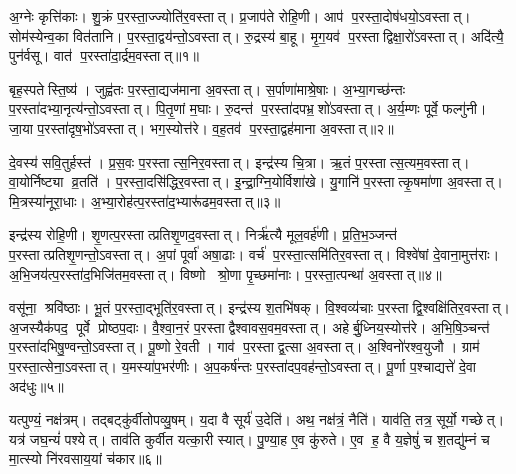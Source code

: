 \clearpage
{}
\setcounter{anuvakam}{0}

अ॒ग्नेः कृत्ति॑काः।
शु॒क्रं प॒रस्ता॒ज्ज्योति॑र॒वस्तात्।
प्र॒जाप॑ते रोहि॒णी।
आप॑ प॒रस्ता॒दोष॑धयो॒ऽवस्तात्।
सोम॑स्येन्व॒का वित॑तानि।
प॒रस्ता॒द्वय॑न्तो॒ऽवस्तात्।
रु॒द्रस्य॑ बा॒हू।
मृ॒ग॒यव॑ प॒रस्ताद्विक्षा॒रो॑ऽवस्तात्।
अदि॑त्यै॒ पुन॑र्वसू।
वात॑ प॒रस्ता॑दा॒र्द्रम॒वस्तात्॥१॥

बृह॒स्पतेस्ति॒ष्य॑।
जुह्व॑तः प॒रस्ता॒द्यज॑माना अ॒वस्तात्।
स॒र्पाणा॑माश्रे॒षाः।
अ॒भ्या॒गच्छ॑न्तः प॒रस्ता॑दभ्या॒नृत्य॑न्तो॒\-ऽवस्तात्।
पि॒तृ॒णां म॒घाः।
रु॒दन्त॑ प॒रस्ता॑दपभ्र॒शो॑ऽवस्तात्।
अ॒र्य॒म्णः पूर्वे॒ फल्गु॑नी।
जा॒या प॒रस्ता॑दृष॒भो॑ऽवस्तात्।
भग॒स्योत्त॑रे।
व॒ह॒तव॑ प॒रस्ता॒द्वह॑माना अ॒वस्तात्॥२॥

दे॒वस्य॑ सवि॒तुर्\mbox{}हस्त॑।
प्र॒स॒वः प॒रस्तात्स॒निर॒वस्तात्।
इन्द्र॑स्य चि॒त्रा।
ऋ॒तं प॒रस्तात्स॒त्यम॒वस्तात्।
वा॒योर्निष्ट्या व्र॒तति॑।
प॒रस्ता॒दसि॑द्धिर॒वस्तात्।
इ॒न्द्रा॒ग्नि॒योर्विशा॑खे।
यु॒गानि॑ प॒रस्तात्कृ॒षमा॑णा अ॒वस्तात्।
मि॒त्रस्या॑नूरा॒धाः।
अ॒भ्या॒रोह॑त्प॒रस्ता॑द॒भ्यारू॑ढम॒वस्तात्॥३॥

इन्द्र॑स्य रोहि॒णी।
शृ॒णत्प॒रस्तात्प्रतिशृ॒णद॒वस्तात्।
निर्\mbox{}ऋ॑त्यै मूल॒वर्\mbox{}ह॑णी।
प्र॒ति॒भ॒ञ्जन्त॑ प॒रस्तात्प्रतिशृ॒णन्तो॒ऽवस्तात्।
अ॒पां पूर्वा॑ अषा॒ढाः।
वर्च॑ प॒रस्ता॒त्समि॑तिर॒वस्तात्।
विश्वे॑षां दे॒वाना॒मुत्त॑राः।
अ॒भि॒जय॑त्प॒रस्ता॑द॒भिजि॑तम॒वस्तात्।
विष्णो श्रो॒णा पृ॒च्छमा॑नाः।
प॒रस्ता॒त्पन्था॑ अ॒वस्तात्॥४॥

वसू॑ना॒ श्रवि॑ष्ठाः।
भू॒तं प॒रस्ता॒द्भूति॑र॒वस्तात्।
इन्द्र॑स्य श॒तभि॑षक्।
वि॒श्वव्य॑चाः प॒रस्ताद्वि॒श्वक्षि॑तिर॒वस्तात्।
अ॒जस्यैक॑पद॒ पूर्वे प्रोष्ठप॒दाः।
वै॒श्वा॒न॒रं प॒रस्ताद्वैश्वावस॒वम॒\-वस्तात्।
अहेर्बु॒ध्निय॒स्योत्त॑रे।
अ॒भि॒षि॒ञ्चन्त॑ प॒रस्ता॑दभि\-षु॒ण्वन्तो॒ऽवस्तात्।
पू॒ष्णो रे॒वती।
गाव॑ प॒रस्ताद्व॒त्सा अ॒वस्तात्।
अ॒श्विनो॑रश्व॒युजौ।
ग्राम॑ प॒रस्ता॒त्सेना॒ऽवस्तात्।
य॒मस्या॑प॒भर॑णीः।
अ॒प॒कर्\mbox{}ष॑न्तः प॒रस्ता॑दप॒वह॑न्तो॒ऽवस्तात्।
पू॒र्णा प॒श्चाद्यत्ते॑ दे॒वा अद॑धुः॥५॥\anuvakamend[आ॒र्द्रम॒वस्ता॒द्वह॑माना अ॒वस्ता॑द॒भ्यारू॑ढम॒वस्ता॒त्पन्था॑ अ॒वस्ताद्व॒त्सा अ॒वस्ता॒त्पञ्च॑ च]

यत्पुण्यं॒ नक्ष॑त्रम्।
तद्बट्कु॑र्वीतोपव्यु॒षम्।
य॒दा वै सूर्य॑ उ॒देति॑।
अथ॒ नक्ष॑त्रं॒ नैति॑।
याव॑ति॒ तत्र॒ सूर्यो॒ गच्छेत्।
यत्र॑ जघ॒न्यं॑ पश्येत्।
ताव॑ति कुर्वीत यत्का॒री स्यात्।
पु॒ण्या॒ह ए॒व कु॑रुते।
ए॒व ह॒ वै य॒ज्ञेषुं॑ च श॒तद्यु॑म्नं च मा॒त्स्यो नि॑रवसाय॒यां च॑कार॥६॥

